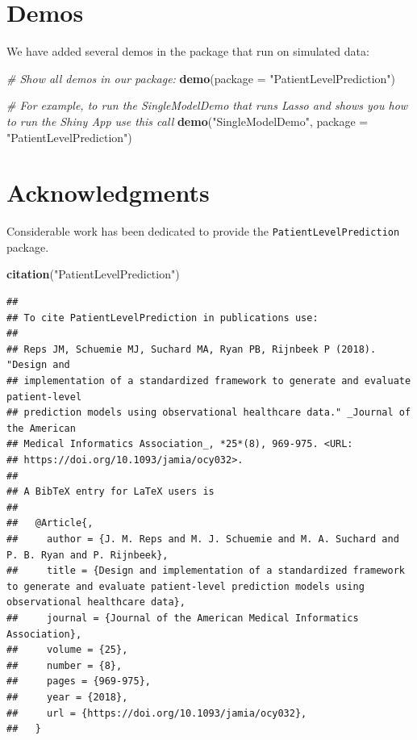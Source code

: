 \documentclass[
]{article}
\newenvironment{Shaded}{\begin{snugshade}}{\end{snugshade}}
\newcommand{\CommentTok}[1]{\textcolor[rgb]{0.56,0.35,0.01}{\textit{#1}}}
\newcommand{\DataTypeTok}[1]{\textcolor[rgb]{0.13,0.29,0.53}{#1}}
\newcommand{\KeywordTok}[1]{\textcolor[rgb]{0.13,0.29,0.53}{\textbf{#1}}}
\newcommand{\NormalTok}[1]{#1}
\newcommand{\StringTok}[1]{\textcolor[rgb]{0.31,0.60,0.02}{#1}}
\begin{document}
\hypertarget{demos}{%
\section{Demos}\label{demos}}

We have added several demos in the package that run on simulated data:

\begin{Shaded}
\begin{Highlighting}[]
\CommentTok{# Show all demos in our package: }
\KeywordTok{demo}\NormalTok{(}\DataTypeTok{package =} \StringTok{"PatientLevelPrediction"}\NormalTok{)}

\CommentTok{# For example, to run the SingleModelDemo that runs Lasso and shows you how to run the Shiny App use this call}
\KeywordTok{demo}\NormalTok{(}\StringTok{"SingleModelDemo"}\NormalTok{, }\DataTypeTok{package =} \StringTok{"PatientLevelPrediction"}\NormalTok{)}
\end{Highlighting}
\end{Shaded}

\newpage

\hypertarget{acknowledgments}{%
\section{Acknowledgments}\label{acknowledgments}}

Considerable work has been dedicated to provide the
\texttt{PatientLevelPrediction} package.

\begin{Shaded}
\begin{Highlighting}[]
\KeywordTok{citation}\NormalTok{(}\StringTok{"PatientLevelPrediction"}\NormalTok{)}
\end{Highlighting}
\end{Shaded}

\begin{verbatim}
## 
## To cite PatientLevelPrediction in publications use:
## 
## Reps JM, Schuemie MJ, Suchard MA, Ryan PB, Rijnbeek P (2018). "Design and
## implementation of a standardized framework to generate and evaluate patient-level
## prediction models using observational healthcare data." _Journal of the American
## Medical Informatics Association_, *25*(8), 969-975. <URL:
## https://doi.org/10.1093/jamia/ocy032>.
## 
## A BibTeX entry for LaTeX users is
## 
##   @Article{,
##     author = {J. M. Reps and M. J. Schuemie and M. A. Suchard and P. B. Ryan and P. Rijnbeek},
##     title = {Design and implementation of a standardized framework to generate and evaluate patient-level prediction models using observational healthcare data},
##     journal = {Journal of the American Medical Informatics Association},
##     volume = {25},
##     number = {8},
##     pages = {969-975},
##     year = {2018},
##     url = {https://doi.org/10.1093/jamia/ocy032},
##   }
\end{verbatim}
\end{document}

